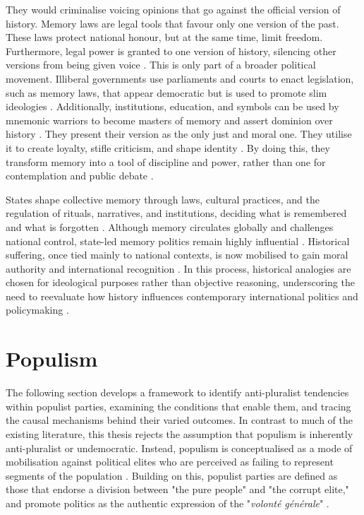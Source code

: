 They would criminalise voicing opinions that go against the official version of history. Memory laws are legal tools that favour only one version of the past. These laws protect national honour, but at the same time, limit freedom. Furthermore, legal power is granted to one version of history, silencing other versions from being given voice \citep{grabowski_memory_2018}.
This is only part of a broader political movement. Illiberal governments use parliaments and courts to enact legislation, such as memory laws,  that appear democratic but is used to promote slim ideologies \citep{partner_what_2023}. Additionally, institutions, education, and symbols can be used by mnemonic warriors to become masters of memory and assert dominion over history \citep{bernhard_notitle_2014}. They present their version as the only just and moral one. They utilise it to create loyalty, stifle criticism, and shape identity \citep{bernhard_notitle_2014}. By doing this, they transform memory into a tool of discipline and power, rather than one for contemplation and public debate \citep{woycicka_mnemonic_2024}.

States shape collective memory through laws, cultural practices, and the regulation of rituals, narratives, and institutions, deciding what is remembered and what is forgotten \citep{meijen_populist_2024}. Although memory circulates globally and challenges national control, state-led memory politics remain highly influential \citep{verovsek_caught_2021}. Historical suffering, once tied mainly to national contexts, is now mobilised to gain moral authority and international recognition \citep{assmann_transnational_2014}. In this process, historical analogies are chosen for ideological purposes rather than objective reasoning, underscoring the need to reevaluate how history influences contemporary international politics and policymaking \citep{mumford_parallels_2015}.

\section{Populism}

The following section develops a framework to identify anti-pluralist tendencies within populist parties, examining the conditions that enable them, and tracing the causal mechanisms behind their varied outcomes. In contrast to much of the existing literature, this thesis rejects the assumption that populism is inherently anti-pluralist or undemocratic. Instead, populism is conceptualised as a mode of mobilisation against political elites who are perceived as failing to represent segments of the population \citep{urbinati_2019}. Building on this, populist parties are defined as those that endorse a division between "the pure people" and "the corrupt elite," and promote politics as the authentic expression of the "\textit{volonté générale}" \citep{rooduijn_populist_2024}.

